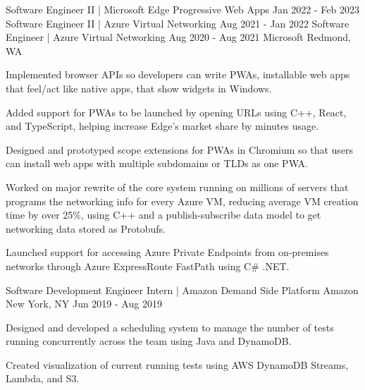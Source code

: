 \begin{cventries}
    \cventrythreepositions
    {Software Engineer II | Microsoft Edge Progressive Web Apps}
    {Jan 2022 - Feb 2023}
    {Software Engineer II | Azure Virtual Networking}
    {Aug 2021 - Jan 2022}
    {Software Engineer | Azure Virtual Networking}
    {Aug 2020 - Aug 2021}
    {Microsoft}
    {Redmond, WA}
    {
        \begin{cvitems} %
            \item {Implemented browser APIs so developers can write PWAs, installable web apps that feel/act like native apps, that show widgets in Windows.}
            \item {Added support for PWAs to be launched by opening URLs using C++, React, and TypeScript, helping increase Edge's market share by minutes usage.}
            \item {Designed and prototyped scope extensions for PWAs in Chromium so that users can install web apps with multiple subdomains or TLDs as one PWA.}
        \end{cvitems}
    }
    {
        \begin{cvitems} %
            \item {Worked on major rewrite of the core system running on millions of servers that programs the networking info for every Azure VM, reducing average VM creation time by over 25\%, using C++ and a publish-subscribe data model to get networking data stored as Protobufs.}
            \item {Launched support for accessing Azure Private Endpoints from on-premises networks through Azure ExpressRoute FastPath using C\# .NET.}
        \end{cvitems}
    }

    \cventry
    {Software Development Engineer Intern | Amazon Demand Side Platform} %
    {Amazon} %
    {New York, NY} %
    {Jun 2019 - Aug 2019} %
    {
        \begin{cvitems} %
            \item {Designed and developed a scheduling system to manage the number of tests running concurrently across the team using Java and DynamoDB.}
            \item {Created visualization of current running tests using AWS DynamoDB Streams, Lambda, and S3.}
        \end{cvitems}
    }


\end{cventries}
